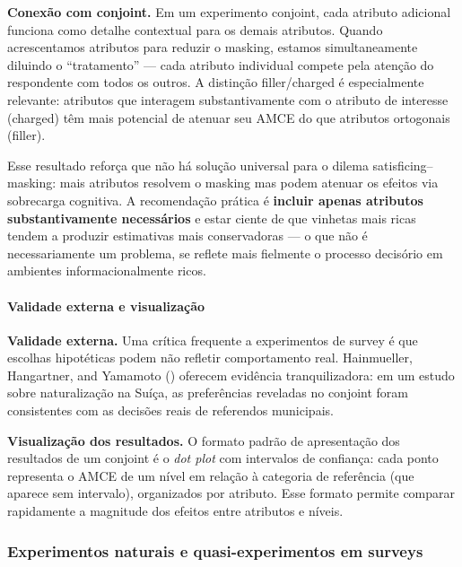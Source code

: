 \documentclass[
]{article}
\begin{document}
\textbf{Conexão com conjoint.} Em um experimento conjoint, cada atributo adicional funciona como detalhe contextual para os demais atributos. Quando acrescentamos atributos para reduzir o masking, estamos simultaneamente diluindo o ``tratamento'' --- cada atributo individual compete pela atenção do respondente com todos os outros. A distinção filler/charged é especialmente relevante: atributos que interagem substantivamente com o atributo de interesse (charged) têm mais potencial de atenuar seu AMCE do que atributos ortogonais (filler).

Esse resultado reforça que não há solução universal para o dilema satisficing--masking: mais atributos resolvem o masking mas podem atenuar os efeitos via sobrecarga cognitiva. A recomendação prática é \textbf{incluir apenas atributos substantivamente necessários} e estar ciente de que vinhetas mais ricas tendem a produzir estimativas mais conservadoras --- o que não é necessariamente um problema, se reflete mais fielmente o processo decisório em ambientes informacionalmente ricos.

\paragraph{Validade externa e visualização}\label{validade-externa-e-visualizauxe7uxe3o}

\textbf{Validade externa.} Uma crítica frequente a experimentos de survey é que escolhas hipotéticas podem não refletir comportamento real. Hainmueller, Hangartner, and Yamamoto () oferecem evidência tranquilizadora: em um estudo sobre naturalização na Suíça, as preferências reveladas no conjoint foram consistentes com as decisões reais de referendos municipais.

\textbf{Visualização dos resultados.} O formato padrão de apresentação dos resultados de um conjoint é o \emph{dot plot} com intervalos de confiança: cada ponto representa o AMCE de um nível em relação à categoria de referência (que aparece sem intervalo), organizados por atributo. Esse formato permite comparar rapidamente a magnitude dos efeitos entre atributos e níveis.

\subsubsection{Experimentos naturais e quasi-experimentos em surveys}\label{experimentos-naturais-e-quasi-experimentos-em-surveys}
\end{document}
